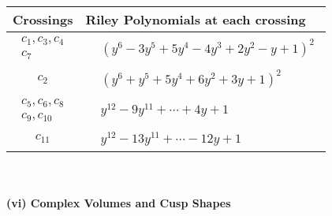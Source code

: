 \documentclass[1p]{elsarticle_modified}
\theoremstyle{definition}
\begin{document}
\begin{tabular}{m{50pt}|m{274pt}}
Crossings & \hspace{64pt}Riley Polynomials at each crossing \\
\hline $$\begin{aligned}c_{1},c_{3},c_{4}\\c_{7}\end{aligned}$$&$\begin{aligned}
&(y^6-3 y^5+5 y^4-4 y^3+2 y^2- y+1)^2
\end{aligned}$\\
\hline $$\begin{aligned}c_{2}\end{aligned}$$&$\begin{aligned}
&(y^6+y^5+5 y^4+6 y^2+3 y+1)^2
\end{aligned}$\\
\hline $$\begin{aligned}c_{5},c_{6},c_{8}\\c_{9},c_{10}\end{aligned}$$&$\begin{aligned}
&y^{12}-9 y^{11}+\cdots+4 y+1
\end{aligned}$\\
\hline $$\begin{aligned}c_{11}\end{aligned}$$&$\begin{aligned}
&y^{12}-13 y^{11}+\cdots-12 y+1
\end{aligned}$\\
\hline
\end{tabular}\\~\\
\newpage\flushleft \textbf{(vi) Complex Volumes and Cusp Shapes}
\end{document}
